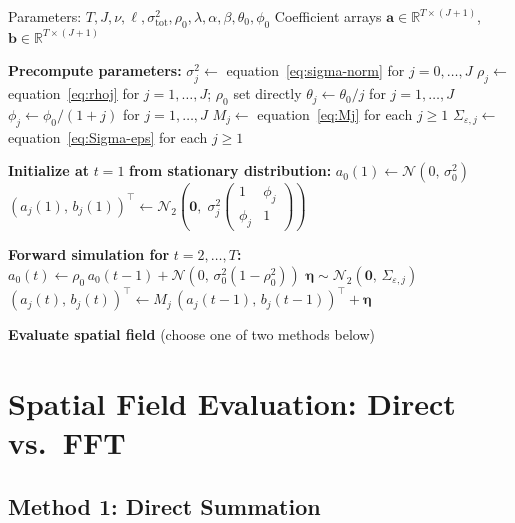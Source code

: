 \documentclass[12pt]{article}
\begin{document}
\begin{algorithm}[H]
\caption{Periodic Fourier--AR(1) Spatio-Temporal Simulation}
\begin{algorithmic}[1]
\Require Parameters: $T, J, \nu, \ell, \sigma^2_\mathrm{tot}, \rho_0, \lambda, \alpha, \beta, \theta_0, \phi_0$
\Ensure Coefficient arrays $\mathbf{a} \in \mathbb{R}^{T \times (J+1)}$, $\mathbf{b} \in \mathbb{R}^{T \times (J+1)}$

\State \textbf{Precompute parameters:}
\State \quad $\sigma_j^2 \gets$ equation~\eqref{eq:sigma-norm} for $j = 0,\ldots,J$
\State \quad $\rho_j \gets$ equation~\eqref{eq:rhoj} for $j = 1,\ldots,J$; \; $\rho_0$ set directly
\State \quad $\theta_j \gets \theta_0 / j$ for $j = 1,\ldots,J$
\State \quad $\phi_j \gets \phi_0 / (1+j)$ for $j = 1,\ldots,J$
\State \quad $M_j \gets$ equation~\eqref{eq:Mj} for each $j \geq 1$
\State \quad $\Sigma_{\varepsilon,j} \gets$ equation~\eqref{eq:Sigma-eps} for each $j \geq 1$

\State \textbf{Initialize at} $t = 1$ \textbf{from stationary distribution:}
\State \quad $a_0(1) \gets \mathcal{N}(0,\, \sigma_0^2)$
  \State $(a_j(1),\, b_j(1))^\top \gets \mathcal{N}_2\!\left(\mathbf{0},\; \sigma_j^2 \begin{pmatrix} 1 & \phi_j \\ \phi_j & 1 \end{pmatrix}\right)$
\EndFor

\State \textbf{Forward simulation for} $t = 2,\ldots,T$\textbf{:}
  \State $a_0(t) \gets \rho_0\, a_0(t-1) + \mathcal{N}(0,\, \sigma_0^2(1-\rho_0^2))$
    \State $\boldsymbol{\eta} \sim \mathcal{N}_2(\mathbf{0},\, \Sigma_{\varepsilon,j})$
    \State $(a_j(t),\, b_j(t))^\top \gets M_j\,(a_j(t-1),\, b_j(t-1))^\top + \boldsymbol{\eta}$
  \EndFor
\EndFor

\State \textbf{Evaluate spatial field} (choose one of two methods below)
\end{algorithmic}
\end{algorithm}

\section{Spatial Field Evaluation: Direct vs.\ FFT}

\subsection{Method 1: Direct Summation}
\end{document}
